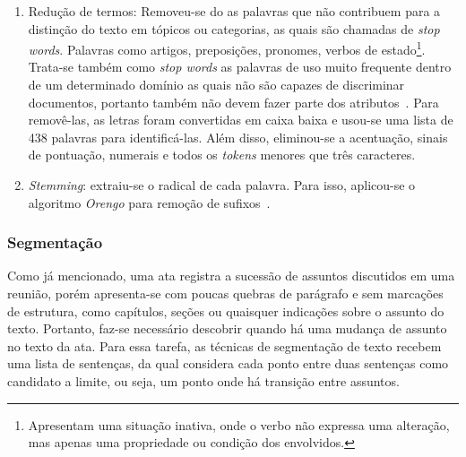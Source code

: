 \begin{enumerate}
\begin{algorithm}
	\caption{Identificação de finais de sentença}
	\label{alg:identificacaofinaisdesent}
\end{algorithm}




\item Redução de termos: Removeu-se do as palavras que não contribuem para a distinção do texto em tópicos ou categorias, as quais são chamadas de \textit{stop words}. Palavras como artigos, preposições, pronomes, verbos de estado\footnote{Apresentam uma situação inativa, onde o verbo não expressa uma alteração, mas apenas uma propriedade ou condição dos envolvidos.}. Trata-se também como \textit{stop words} as palavras de uso muito frequente dentro de um determinado domínio as quais não são capazes de discriminar documentos, portanto também não devem fazer parte dos atributos~\cite{Rezende2003}. Para removê-las, as letras foram convertidas em caixa baixa e usou-se uma lista de 438 palavras para identificá-las. Além disso, eliminou-se a acentuação, sinais de pontuação, numerais e todos os \textit{tokens} menores que três caracteres.

\item \textit{Stemming}: extraiu-se o radical de cada palavra. Para isso, aplicou-se o algoritmo \textit{Orengo} %
	para remoção de sufixos~\cite{Alvares2005}.

\end{enumerate}
	







\subsubsection{Segmentação}


Como já mencionado, uma ata registra a sucessão de assuntos discutidos em uma reunião, porém apresenta-se com poucas quebras de parágrafo e sem marcações de estrutura, como capítulos, seções ou quaisquer indicações sobre o assunto do texto. Portanto, faz-se necessário descobrir quando há uma mudança de assunto no texto da ata. Para essa tarefa, as técnicas de segmentação de texto recebem uma lista de sentenças, da qual considera cada ponto entre duas sentenças como candidato a limite, ou seja, um ponto onde há transição entre assuntos. 

